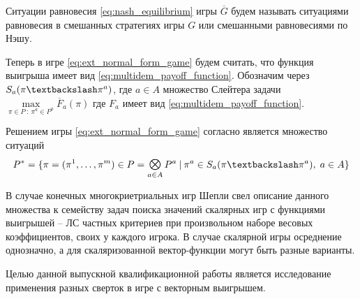 Ситуации равновесия \eqref{eq:nash_equilibrium} игры $\overline G$
будем называть ситуациями равновесия в смешанных стратегиях игры $G$
или смешанными равновесиями по Нэшу. 

Теперь в игре \eqref{eq:ext_normal_form_game} будем считать, что функция
выигрыша имеет вид \eqref{eq:multidem_payoff_function}.
Обозначим через $S_a(\pi \textbackslash \pi^a)$, где 
$a \in A$ множество Слейтера задачи 
$
	\max \limits_{\pi \in P \: : \: \pi^a \in P^a} \overline F_a(\pi) 
$
где $F_a$ имеет вид \eqref{eq:multidem_payoff_function}.

\begin{Def}
	Решением игры \eqref{eq:ext_normal_form_game} согласно \cite{blackwell} 
	является множество ситуаций 
	\begin{equation}
		P^* = \{ 
			\pi = (\pi^1, \ldots, \pi^m) \in P = \Motimes_{a \in A} P^a \: | \:
			\pi^a \in S_a(\pi \textbackslash \pi^a), \; a \in A
		\}
		\label{eq:game_solution}
	\end{equation}
\end{Def}

В случае конечных многокриетриальных игр Шепли свел \cite{shapley}
описание данного множества к семейству задач поиска значений 
скалярных игр с 
функциями выигрышей -- ЛС частных критериев при произвольном наборе
весовых коэффициентов, своих у каждого игрока.
В случае скалярной игры осреднение однозначно, а  для скаляризованной
вектор-функции могут быть разные варианты.

Целью данной выпускной квалификационной работы является исследование 
применения разных сверток в игре с векторным выигрышем.